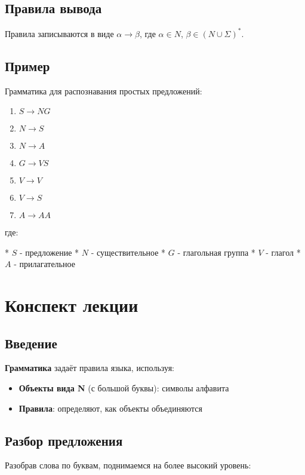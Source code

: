 \documentclass{article}
\begin{document}
\begin{itemize}
\subsection{Правила вывода}

Правила записываются в виде $\alpha \rightarrow \beta$, где $\alpha \in N$, $\beta \in (N \cup \Sigma)^*$.

\subsection{Пример}

Грамматика для распознавания простых предложений:

\begin{enumerate}
\item $S \rightarrow N G$
\item $N \rightarrow S$
\item $N \rightarrow A$
\item $G \rightarrow V S$
\item $V \rightarrow V$
\item $V \rightarrow S$
\item $A \rightarrow A A$
\end{enumerate}

где:

* $S$ - предложение
* $N$ - существительное
* $G$ - глагольная группа
* $V$ - глагол
* $A$ - прилагательное
\section{Конспект лекции}

\subsection{Введение}

\textbf{Грамматика} задаёт правила языка, используя:
\begin{itemize}
  \item \textbf{Объекты вида N} (с большой буквы): символы алфавита
  \item \textbf{Правила}: определяют, как объекты объединяются
\end{itemize}

\subsection{Разбор предложения}

Разобрав слова по буквам, поднимаемся на более высокий уровень:


\end{itemize}
\end{document}
